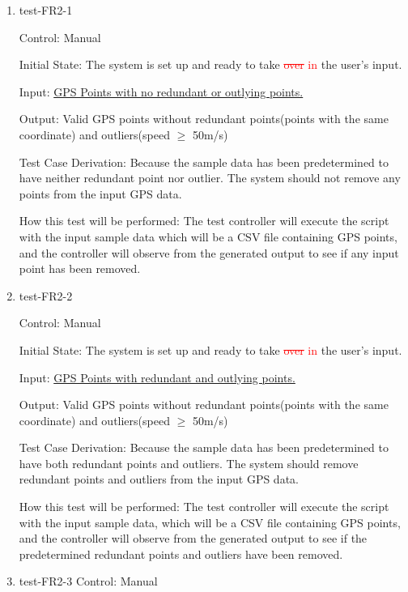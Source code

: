 \documentclass[12pt, titlepage]{article}
\begin{document}
\begin{enumerate}

\item{test-FR2-1} \label{test-FR2-1}

Control: Manual
					
Initial State: The system is set up and ready to take \textcolor{red}{\sout{over} in} the user's input.
					
Input: \href{https://github.com/paezha/PyERT-BLACK/blob/rev0-test/test/test_data/fr-tests/fr2-1-in.csv}{GPS Points with no redundant or outlying points.}
					
Output: Valid GPS points without redundant points(points with the same coordinate) and outliers(speed $\geq$ 50m/s)

Test Case Derivation: Because the sample data has been predetermined to have neither redundant point nor outlier. The system should not remove any points from the input GPS data.

How this test will be performed: The test controller will execute the script with the input sample data which will be a CSV file containing GPS points, and the controller will observe from the generated output to see if any input point has been removed.

\item{test-FR2-2} \label{test-FR2-2}

Control: Manual
					
Initial State: The system is set up and ready to take \textcolor{red}{\sout{over} in} the user's input.
					
Input: \href{https://github.com/paezha/PyERT-BLACK/blob/rev0-test/test/test_data/fr-tests/fr2-2-in.csv}{GPS Points with redundant and outlying points.}
					
Output: Valid GPS points without redundant points(points with the same coordinate) and outliers(speed $\geq$ 50m/s)

Test Case Derivation: Because the sample data has been predetermined to have both redundant points and outliers. The system should remove redundant points and outliers from the input GPS data.

How this test will be performed: The test controller will execute the script with the input sample data, which will be a CSV file containing GPS points, and the controller will observe from the generated output to see if the predetermined redundant points and outliers have been removed.

\item{test-FR2-3} \label{test-FR2-3}
Control: Manual
					

\end{enumerate}
\end{document}
